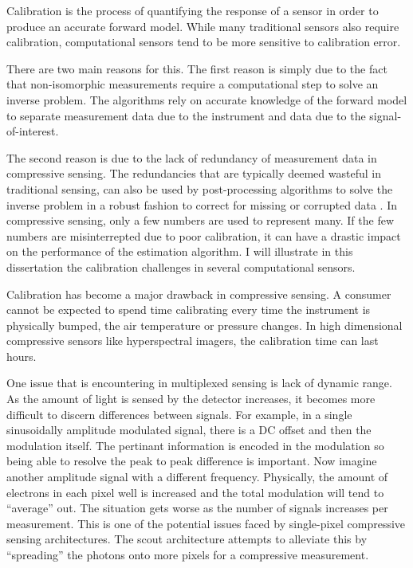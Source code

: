 Calibration is the process of quantifying the response of a sensor in order to produce an accurate forward model. While many traditional sensors also require calibration, computational sensors tend to be more sensitive to calibration error. 

There are two main reasons for this. The first reason is simply due to the fact that non-isomorphic measurements require a computational step to solve an inverse problem. The algorithms rely on accurate knowledge of the forward model to separate measurement data due to the instrument and data due to the signal-of-interest. 

The second reason is due to the lack of redundancy of measurement data in compressive sensing. The redundancies that are typically deemed wasteful in traditional sensing, can also be used by post-processing algorithms to solve the inverse problem in a robust fashion to correct for missing or corrupted data \cite{gehm2013calibration}. In \gls{compressive sensing}, only a few numbers are used to represent many. If the few numbers are misinterrepted due to poor calibration, it can have a drastic impact on the performance of the estimation algorithm. I will illustrate in this dissertation the calibration challenges in several computational sensors. 

Calibration has become a major drawback in compressive sensing. A consumer cannot be expected to spend time calibrating every time the instrument is physically bumped, the air temperature or pressure changes. In high dimensional compressive sensors like hyperspectral imagers, the calibration time can last hours.

One issue that is encountering in multiplexed sensing is lack of dynamic range. As the amount of light is sensed by the detector increases, it becomes more difficult to discern differences between signals. For example, in a single sinusoidally amplitude modulated signal, there is a DC offset and then the modulation itself. The pertinant information is encoded in the modulation so being able to resolve the peak to peak difference is important. Now imagine another amplitude signal with a different frequency. Physically, the amount of electrons in each pixel well is increased and the total modulation will tend to ``average'' out. The situation gets worse as the number of signals increases per measurement. This is one of the potential issues faced by single-pixel compressive sensing architectures. The \gls{scout} architecture attempts to alleviate this by ``spreading'' the photons onto more pixels for a compressive measurement. 


